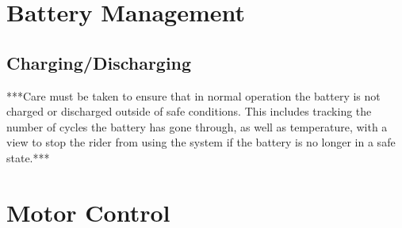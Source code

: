 \documentclass[journal,10pt]{IEEEtran}
\begin{document}
\section{Battery Management}
	\subsection{Charging/Discharging}
	***Care must be taken to ensure that in normal operation the battery is not charged or discharged outside of safe conditions.
	This includes tracking the number of cycles the battery has gone through, as well as temperature, with a view to stop the rider from using the system if the battery is no longer in a safe state.***
	
\section{Motor Control}
\end{document}
